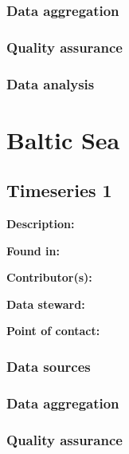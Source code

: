 \documentclass[
]{book}
\begin{document}
\hypertarget{data-aggregation-5}{%
\subsection{Data aggregation}\label{data-aggregation-5}}

\hypertarget{quality-assurance-5}{%
\subsection{Quality assurance}\label{quality-assurance-5}}

\hypertarget{data-analysis-5}{%
\subsection{Data analysis}\label{data-analysis-5}}

\hypertarget{baltic-sea}{%
\chapter{Baltic Sea}\label{baltic-sea}}

\hypertarget{timeseries-1-5}{%
\section{Timeseries 1}\label{timeseries-1-5}}

\textbf{Description:}

\textbf{Found in:}

\textbf{Contributor(s):}

\textbf{Data steward:}

\textbf{Point of contact:}

\hypertarget{data-sources-6}{%
\subsection{Data sources}\label{data-sources-6}}

\hypertarget{data-aggregation-6}{%
\subsection{Data aggregation}\label{data-aggregation-6}}

\hypertarget{quality-assurance-6}{%
\subsection{Quality assurance}\label{quality-assurance-6}}
\end{document}
